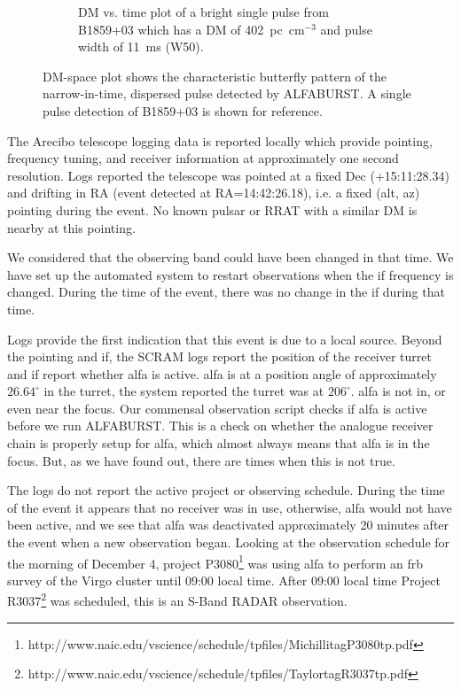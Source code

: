 \documentclass[a4paper,fleqn,usenatbib]{mnras}
\begin{document}
\begin{figure}
\begin{subfigure}[t]{0.5\textwidth}
        \caption{DM vs. time plot of a bright single pulse from B1859+03 which
        has a DM of 402~pc~cm$^{-3}$ and pulse width of 11~ms (W50).
        }
        \label{fig:dm_time_B1859}
    \end{subfigure}
    \caption{DM-space plot shows the characteristic butterfly pattern of the
    narrow-in-time, dispersed pulse detected by ALFABURST. A single pulse
    detection of B1859+03 is shown for reference.
    }
    \label{fig:dm_time}
\end{figure}

The Arecibo telescope logging data is reported locally which provide pointing,
frequency tuning, and receiver information at approximately one second
resolution. Logs reported the telescope was pointed at a fixed Dec
(+15:11:28.34) and drifting in RA (event detected at RA=14:42:26.18), i.e. a
fixed (alt, az) pointing during the event. No known pulsar or RRAT with a
similar DM is nearby at this pointing.

We considered that the observing band could have been changed in that time.  We
have set up the automated system to restart observations when the \gls{if}
frequency is changed.  During the time of the event, there was no change in the
\gls{if} during that time.

Logs provide the first indication that this event is due to a local source.
Beyond the pointing and \gls{if}, the SCRAM logs report the position of the
receiver turret and \gls{if} report whether \gls{alfa} is active. \gls{alfa} is
at a position angle of approximately $26.64^{\circ}$ in the turret, the system
reported the turret was at $206^{\circ}$. \gls{alfa} is not in, or even near the
focus.  Our commensal observation script checks if \gls{alfa} is active before
we run ALFABURST. This is a check on whether the analogue receiver chain is
properly setup for \gls{alfa}, which almost always means that \gls{alfa} is in
the focus.  But, as we have found out, there are times when this is not true.

The logs do not report the active project or observing schedule. During the time
of the event it appears that no receiver was in use, otherwise, \gls{alfa} would
not have been active, and we see that \gls{alfa} was deactivated approximately
20 minutes after the event when a new observation began.  Looking at the
observation schedule for the morning of December 4, project
P3080\footnote{http://www.naic.edu/vscience/schedule/tpfiles/MichillitagP3080tp.pdf}
was using \gls{alfa} to perform an \gls{frb} survey of the Virgo cluster until
09:00 local time.  After 09:00 local time Project
R3037\footnote{http://www.naic.edu/vscience/schedule/tpfiles/TaylortagR3037tp.pdf}
was scheduled, this is an S-Band RADAR observation.
\end{document}
